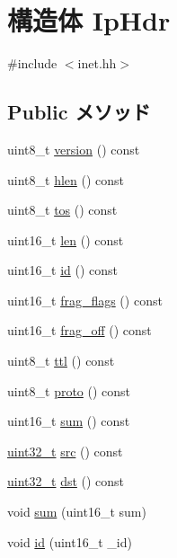 \hypertarget{structNet_1_1IpHdr}{
\section{構造体 IpHdr}
\label{structNet_1_1IpHdr}
}


{\ttfamily \#include $<$inet.hh$>$}\subsection*{Public メソッド}
\begin{DoxyCompactItemize}
\item 
uint8\_\-t \hyperlink{structNet_1_1IpHdr_aa3599d88ee3f2dd92bec653b3a607b6b}{version} () const 
\item 
uint8\_\-t \hyperlink{structNet_1_1IpHdr_af9fa03e0db57f22a41099243b33a6825}{hlen} () const 
\item 
uint8\_\-t \hyperlink{structNet_1_1IpHdr_a3e6d0a8eff33e0b923222365fbeff0ef}{tos} () const 
\item 
uint16\_\-t \hyperlink{structNet_1_1IpHdr_aca537e1680645b058d622981e2fb1c13}{len} () const 
\item 
uint16\_\-t \hyperlink{structNet_1_1IpHdr_ad7a497f547f07fe4ac682194ed947640}{id} () const 
\item 
uint16\_\-t \hyperlink{structNet_1_1IpHdr_a9560560c1794340e38ce0c57de395e26}{frag\_\-flags} () const 
\item 
uint16\_\-t \hyperlink{structNet_1_1IpHdr_a0a3a20b42e18de08418ef99471e7e006}{frag\_\-off} () const 
\item 
uint8\_\-t \hyperlink{structNet_1_1IpHdr_a9618cc77ddbbbdcbeb181b51cb1c3fc5}{ttl} () const 
\item 
uint8\_\-t \hyperlink{structNet_1_1IpHdr_abb57dba0db48d3e9fea9d5aedf436c3e}{proto} () const 
\item 
uint16\_\-t \hyperlink{structNet_1_1IpHdr_acbf3c502c7393ef0178454b237b2562f}{sum} () const 
\item 
\hyperlink{Type_8hh_a435d1572bf3f880d55459d9805097f62}{uint32\_\-t} \hyperlink{structNet_1_1IpHdr_aefa78f6739e5a282710f048091182465}{src} () const 
\item 
\hyperlink{Type_8hh_a435d1572bf3f880d55459d9805097f62}{uint32\_\-t} \hyperlink{structNet_1_1IpHdr_abaa51876b847ffb08a197c2629fd726f}{dst} () const 
\item 
void \hyperlink{structNet_1_1IpHdr_ae0171ec0578adacce8cceb6a804f97f1}{sum} (uint16\_\-t sum)
\item 
void \hyperlink{structNet_1_1IpHdr_a9db8dfe86557c01909531924c64daddb}{id} (uint16\_\-t \_\-id)

\end{DoxyCompactItemize}
